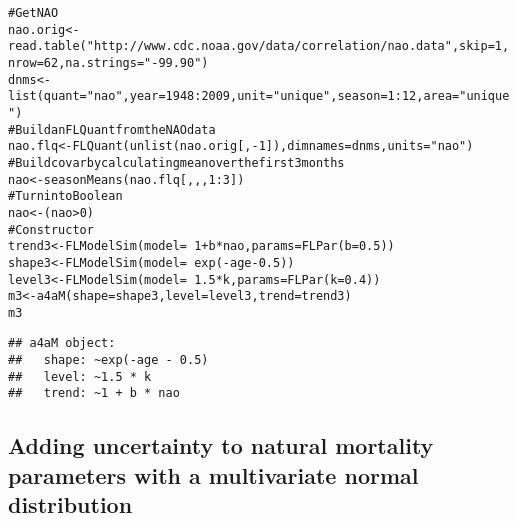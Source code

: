 \documentclass[a4paper,english,10pt]{article}\usepackage[]{graphicx}\usepackage[]{color}
\makeatletter
\newcommand{\hlnum}[1]{\textcolor[rgb]{0.2,0.2,0.2}{#1}}%
\newcommand{\hlstr}[1]{\textcolor[rgb]{0.2,0.2,0.2}{#1}}%
\newcommand{\hlcom}[1]{\textcolor[rgb]{0.2,0.267,0.4}{#1}}%
\newcommand{\hlopt}[1]{\textcolor[rgb]{0.2,0.2,0.2}{#1}}%
\newcommand{\hlstd}[1]{\textcolor[rgb]{0,0,0}{#1}}%
\newcommand{\hlkwb}[1]{\textcolor[rgb]{0.361,0.506,0.596}{#1}}%
\newcommand{\hlkwc}[1]{\textcolor[rgb]{0.361,0.506,0.596}{#1}}%
\newcommand{\hlkwd}[1]{\textcolor[rgb]{0.361,0.506,0.596}{#1}}%
\newenvironment{kframe}{%
 \def\at@end@of@kframe{}%
 \ifinner\ifhmode%
  \def\at@end@of@kframe{\end{minipage}}%
  \begin{minipage}{\columnwidth}%
 \fi\fi%
 \def\FrameCommand##1{\hskip\@totalleftmargin \hskip-\fboxsep
 \colorbox{shadecolor}{##1}\hskip-\fboxsep
     \hskip-\linewidth \hskip-\@totalleftmargin \hskip\columnwidth}%
 \MakeFramed {\advance\hsize-\width
   \@totalleftmargin\z@ \linewidth\hsize
   \@setminipage}}%
 {\par\unskip\endMakeFramed%
 \at@end@of@kframe}
\newenvironment{knitrout}{}{} %
\makeatother
\begin{document}
\begin{knitrout}
\color{fgcolor}\begin{kframe}
\begin{alltt}
\hlcom{# Get NAO}
\hlstd{nao.orig} \hlkwb{<-} \hlkwd{read.table}\hlstd{(}\hlstr{"http://www.cdc.noaa.gov/data/correlation/nao.data"}\hlstd{,} \hlkwc{skip}\hlstd{=}\hlnum{1}\hlstd{,} \hlkwc{nrow}\hlstd{=}\hlnum{62}\hlstd{,} \hlkwc{na.strings}\hlstd{=}\hlstr{"-99.90"}\hlstd{)}
\hlstd{dnms} \hlkwb{<-} \hlkwd{list}\hlstd{(}\hlkwc{quant}\hlstd{=}\hlstr{"nao"}\hlstd{,} \hlkwc{year}\hlstd{=}\hlnum{1948}\hlopt{:}\hlnum{2009}\hlstd{,} \hlkwc{unit}\hlstd{=}\hlstr{"unique"}\hlstd{,} \hlkwc{season}\hlstd{=}\hlnum{1}\hlopt{:}\hlnum{12}\hlstd{,} \hlkwc{area}\hlstd{=}\hlstr{"unique"}\hlstd{)}
\hlcom{# Build an FLQuant from the NAO data}
\hlstd{nao.flq} \hlkwb{<-} \hlkwd{FLQuant}\hlstd{(}\hlkwd{unlist}\hlstd{(nao.orig[,}\hlopt{-}\hlnum{1}\hlstd{]),} \hlkwc{dimnames}\hlstd{=dnms,} \hlkwc{units}\hlstd{=}\hlstr{"nao"}\hlstd{)}
\hlcom{# Build covar by calculating mean over the first 3 months}
\hlstd{nao} \hlkwb{<-} \hlkwd{seasonMeans}\hlstd{(nao.flq[,,,}\hlnum{1}\hlopt{:}\hlnum{3}\hlstd{])}
\hlcom{# Turn into Boolean}
\hlstd{nao} \hlkwb{<-} \hlstd{(nao}\hlopt{>}\hlnum{0}\hlstd{)}
\hlcom{# Constructor}
\hlstd{trend3} \hlkwb{<-} \hlkwd{FLModelSim}\hlstd{(}\hlkwc{model}\hlstd{=}\hlopt{~}\hlnum{1}\hlopt{+}\hlstd{b}\hlopt{*}\hlstd{nao,} \hlkwc{params}\hlstd{=}\hlkwd{FLPar}\hlstd{(}\hlkwc{b}\hlstd{=}\hlnum{0.5}\hlstd{))}
\hlstd{shape3} \hlkwb{<-} \hlkwd{FLModelSim}\hlstd{(}\hlkwc{model}\hlstd{=}\hlopt{~}\hlkwd{exp}\hlstd{(}\hlopt{-}\hlstd{age}\hlopt{-}\hlnum{0.5}\hlstd{))}
\hlstd{level3} \hlkwb{<-} \hlkwd{FLModelSim}\hlstd{(}\hlkwc{model}\hlstd{=}\hlopt{~}\hlnum{1.5}\hlopt{*}\hlstd{k,} \hlkwc{params}\hlstd{=}\hlkwd{FLPar}\hlstd{(}\hlkwc{k}\hlstd{=}\hlnum{0.4}\hlstd{))}
\hlstd{m3} \hlkwb{<-} \hlkwd{a4aM}\hlstd{(}\hlkwc{shape}\hlstd{=shape3,} \hlkwc{level}\hlstd{=level3,} \hlkwc{trend}\hlstd{=trend3)}
\hlstd{m3}
\end{alltt}
\begin{verbatim}
## a4aM object:
##   shape: ~exp(-age - 0.5)
##   level: ~1.5 * k
##   trend: ~1 + b * nao
\end{verbatim}
\end{kframe}
\end{knitrout}

\subsection{Adding uncertainty to natural mortality parameters with a multivariate normal distribution}
\end{document}
